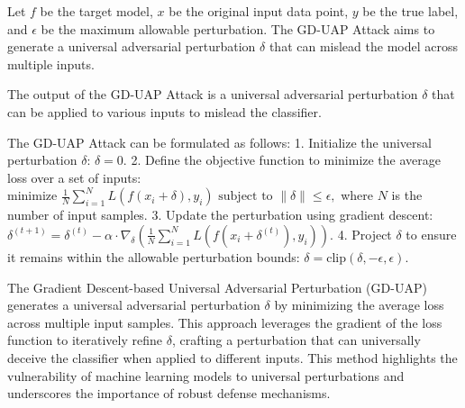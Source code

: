 Let \( f \) be the target model, \( x \) be the original input data point, \( y \) be the true label, and \( \epsilon \) be the maximum allowable perturbation. The GD-UAP Attack aims to generate a universal adversarial perturbation \( \delta \) that can mislead the model across multiple inputs.

The output of the GD-UAP Attack is a universal adversarial perturbation \( \delta \) that can be applied to various inputs to mislead the classifier.

The GD-UAP Attack can be formulated as follows:
1. Initialize the universal perturbation \( \delta \):
   $
   \delta = 0.
   $
2. Define the objective function to minimize the average loss over a set of inputs:
   $
   \text{minimize } \frac{1}{N} \sum_{i=1}^{N} L(f(x_i + \delta), y_i) \text{ subject to } \|\delta\| \leq \epsilon,
   $
   where \( N \) is the number of input samples.
3. Update the perturbation using gradient descent:
   $
   \delta^{(t+1)} = \delta^{(t)} - \alpha \cdot \nabla_{\delta} \left( \frac{1}{N} \sum_{i=1}^{N} L(f(x_i + \delta^{(t)}), y_i) \right).
   $
4. Project \( \delta \) to ensure it remains within the allowable perturbation bounds:
   $
   \delta = \text{clip}(\delta, -\epsilon, \epsilon).
   $

The Gradient Descent-based Universal Adversarial Perturbation (GD-UAP) generates a universal adversarial perturbation \( \delta \) by minimizing the average loss across multiple input samples. This approach leverages the gradient of the loss function to iteratively refine \( \delta \), crafting a perturbation that can universally deceive the classifier when applied to different inputs. This method highlights the vulnerability of machine learning models to universal perturbations and underscores the importance of robust defense mechanisms.
